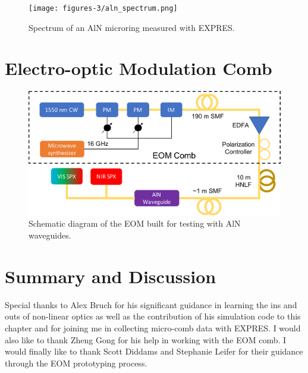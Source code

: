\begin{figure}
    \centering
    \texttt{[image: figures-3/aln\_spectrum.png]}
    \caption{Spectrum of an AlN microring measured with EXPRES.}
    \label{fig:aln_spectrum}
\end{figure}

\section{Electro-optic Modulation Comb} \label{astro-comb:eom}

\begin{figure}
    \centering
    \includegraphics[width=\textwidth]{figures-3/eom-diagram.pdf}
    \caption[Electro-optic modulation comb schematic diagram]{Schematic diagram of the EOM built for testing with AlN waveguides.}
    \label{fig:eom-diagram}
\end{figure}



\section{Summary and Discussion}




Special thanks to Alex Bruch for his significant guidance in learning the ins and outs of non-linear optics as well as the contribution of his simulation code to this chapter and for joining me in collecting micro-comb data with EXPRES. I would also like to thank Zheng Gong for his help in working with the EOM comb. I would finally like to thank Scott Diddams and Stephanie Leifer for their guidance through the EOM prototyping process.